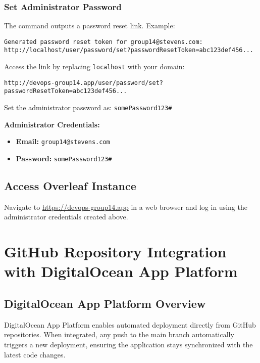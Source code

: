 \subsubsection{Set Administrator Password}

The command outputs a password reset link. Example:

\begin{verbatim}
Generated password reset token for group14@stevens.com:
http://localhost/user/password/set?passwordResetToken=abc123def456...
\end{verbatim}

Access the link by replacing \texttt{localhost} with your domain:

\begin{verbatim}
http://devops-group14.app/user/password/set?passwordResetToken=abc123def456...
\end{verbatim}

Set the administrator password as: \texttt{somePassword123\#}

\textbf{Administrator Credentials:}
\begin{itemize}
    \item \textbf{Email:} \texttt{group14@stevens.com}
    \item \textbf{Password:} \texttt{somePassword123\#}
\end{itemize}

\subsection{Access Overleaf Instance}

Navigate to \url{https://devops-group14.app} in a web browser and log in using the administrator credentials created above.

\section{GitHub Repository Integration with DigitalOcean App Platform}

\subsection{DigitalOcean App Platform Overview}

DigitalOcean App Platform enables automated deployment directly from GitHub repositories. When integrated, any push to the main branch automatically triggers a new deployment, ensuring the application stays synchronized with the latest code changes.

